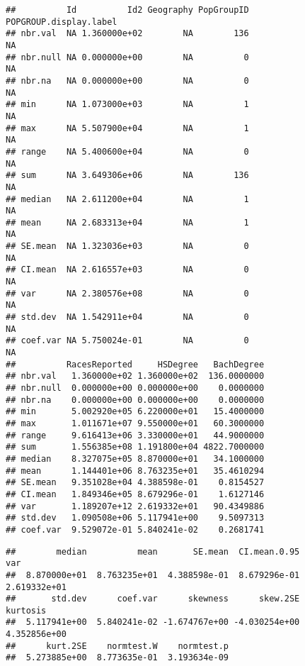\documentclass[
]{article}
\newenvironment{Shaded}{\begin{snugshade}}{\end{snugshade}}
\newcommand{\DataTypeTok}[1]{\textcolor[rgb]{0.13,0.29,0.53}{#1}}
\newcommand{\KeywordTok}[1]{\textcolor[rgb]{0.13,0.29,0.53}{\textbf{#1}}}
\newcommand{\NormalTok}[1]{#1}
\newcommand{\OperatorTok}[1]{\textcolor[rgb]{0.81,0.36,0.00}{\textbf{#1}}}
\newcommand{\OtherTok}[1]{\textcolor[rgb]{0.56,0.35,0.01}{#1}}
\newcommand{\StringTok}[1]{\textcolor[rgb]{0.31,0.60,0.02}{#1}}
\begin{document}
\begin{verbatim}
##          Id          Id2 Geography PopGroupID POPGROUP.display.label
## nbr.val  NA 1.360000e+02        NA        136                     NA
## nbr.null NA 0.000000e+00        NA          0                     NA
## nbr.na   NA 0.000000e+00        NA          0                     NA
## min      NA 1.073000e+03        NA          1                     NA
## max      NA 5.507900e+04        NA          1                     NA
## range    NA 5.400600e+04        NA          0                     NA
## sum      NA 3.649306e+06        NA        136                     NA
## median   NA 2.611200e+04        NA          1                     NA
## mean     NA 2.683313e+04        NA          1                     NA
## SE.mean  NA 1.323036e+03        NA          0                     NA
## CI.mean  NA 2.616557e+03        NA          0                     NA
## var      NA 2.380576e+08        NA          0                     NA
## std.dev  NA 1.542911e+04        NA          0                     NA
## coef.var NA 5.750024e-01        NA          0                     NA
##          RacesReported     HSDegree   BachDegree
## nbr.val   1.360000e+02 1.360000e+02  136.0000000
## nbr.null  0.000000e+00 0.000000e+00    0.0000000
## nbr.na    0.000000e+00 0.000000e+00    0.0000000
## min       5.002920e+05 6.220000e+01   15.4000000
## max       1.011671e+07 9.550000e+01   60.3000000
## range     9.616413e+06 3.330000e+01   44.9000000
## sum       1.556385e+08 1.191800e+04 4822.7000000
## median    8.327075e+05 8.870000e+01   34.1000000
## mean      1.144401e+06 8.763235e+01   35.4610294
## SE.mean   9.351028e+04 4.388598e-01    0.8154527
## CI.mean   1.849346e+05 8.679296e-01    1.6127146
## var       1.189207e+12 2.619332e+01   90.4349886
## std.dev   1.090508e+06 5.117941e+00    9.5097313
## coef.var  9.529072e-01 5.840241e-02    0.2681741
\end{verbatim}

\begin{Shaded}
\end{Shaded}

\begin{verbatim}
##        median          mean       SE.mean  CI.mean.0.95           var 
##  8.870000e+01  8.763235e+01  4.388598e-01  8.679296e-01  2.619332e+01 
##       std.dev      coef.var      skewness      skew.2SE      kurtosis 
##  5.117941e+00  5.840241e-02 -1.674767e+00 -4.030254e+00  4.352856e+00 
##      kurt.2SE    normtest.W    normtest.p 
##  5.273885e+00  8.773635e-01  3.193634e-09
\end{verbatim}
\end{document}
